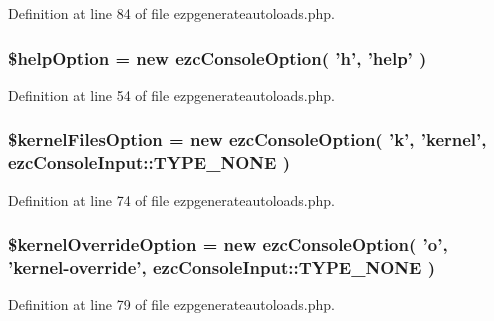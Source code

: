 Definition at line 84 of file ezpgenerateautoloads.\-php.

\hypertarget{ezpgenerateautoloads_8php_a785ce4531ef75b21040c99c8cbce7aa4}{
\subsubsection[{\$help\-Option}]{\setlength{\rightskip}{0pt plus 5cm}\$help\-Option = new ezc\-Console\-Option( 'h', 'help' )}}\label{ezpgenerateautoloads_8php_a785ce4531ef75b21040c99c8cbce7aa4}


Definition at line 54 of file ezpgenerateautoloads.\-php.

\hypertarget{ezpgenerateautoloads_8php_a7e74e8adf0bd544754962f4ddd4fc35b}{
\subsubsection[{\$kernel\-Files\-Option}]{\setlength{\rightskip}{0pt plus 5cm}\$kernel\-Files\-Option = new ezc\-Console\-Option( 'k', 'kernel', ezc\-Console\-Input\-::\-T\-Y\-P\-E\-\_\-\-N\-O\-N\-E )}}\label{ezpgenerateautoloads_8php_a7e74e8adf0bd544754962f4ddd4fc35b}


Definition at line 74 of file ezpgenerateautoloads.\-php.

\hypertarget{ezpgenerateautoloads_8php_a67e31a42e7cb071e5c02df2261d6594a}{
\subsubsection[{\$kernel\-Override\-Option}]{\setlength{\rightskip}{0pt plus 5cm}\$kernel\-Override\-Option = new ezc\-Console\-Option( 'o', 'kernel-\/override', ezc\-Console\-Input\-::\-T\-Y\-P\-E\-\_\-\-N\-O\-N\-E )}}\label{ezpgenerateautoloads_8php_a67e31a42e7cb071e5c02df2261d6594a}


Definition at line 79 of file ezpgenerateautoloads.\-php.

